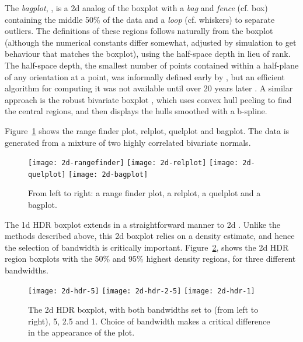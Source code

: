 \documentclass[oneside]{article}
\begin{document}
The \emph{bagplot}, \citep{rousseuw:1999}, is a 2d analog of the boxplot with a \emph{bag} and \emph{fence} (cf. box) containing the middle 50\% of the data and a \emph{loop} (cf. whiskers) to separate outliers. The definitions of these regions follows naturally from the boxplot (although the numerical constants differ somewhat, adjusted by simulation to get behaviour that matches the boxplot), using the half-space depth in lieu of rank. The half-space depth, the smallest number of points contained within a half-plane of any orientation at a point, was informally defined early by \citet{tukey:1975}, but an efficient algorithm for computing it was not available until over 20 years later \citep{rousseeuw:1996}. A similar approach is the robust bivariate boxplot \citep{zani:1998}, which uses convex hull peeling to find the central regions, and then displays the hulls smoothed with a b-spline.

Figure~\ref{fig:2d} shows the range finder plot, relplot, quelplot and bagplot. The data is generated from a mixture of two highly correlated bivariate normals.

\begin{figure}[htbp]
  \centering
  \texttt{[image: 2d-rangefinder]}%
  \texttt{[image: 2d-relplot]}%
  \texttt{[image: 2d-quelplot]}%
  \texttt{[image: 2d-bagplot]}
  \caption{From left to right: a range finder plot, a relplot, a quelplot and a bagplot.}
  \label{fig:2d}
\end{figure}

The 1d HDR boxplot extends in a straightforward manner to 2d \citep{hyndman:1996a}. Unlike the methods described above, this 2d boxplot relies on a density estimate, and hence the selection of bandwidth is critically important. Figure~\ref{fig:2d-hdr}, shows the 2d HDR region boxplots with the 50\% and 95\% highest density regions, for three different bandwidths.

\begin{figure}[htbp]
  \centering
  \texttt{[image: 2d-hdr-5]}%
  \texttt{[image: 2d-hdr-2-5]}%
  \texttt{[image: 2d-hdr-1]}
  \caption{The 2d HDR boxplot, with both bandwidths set to (from left to right), 5, 2.5 and 1. Choice of bandwidth makes a critical difference in the appearance of the plot.}
  \label{fig:2d-hdr}
\end{figure}
\end{document}
